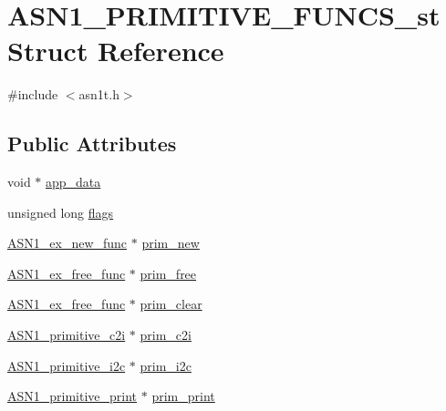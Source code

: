 \hypertarget{struct_a_s_n1___p_r_i_m_i_t_i_v_e___f_u_n_c_s__st}{}\section{A\+S\+N1\+\_\+\+P\+R\+I\+M\+I\+T\+I\+V\+E\+\_\+\+F\+U\+N\+C\+S\+\_\+st Struct Reference}
\label{struct_a_s_n1___p_r_i_m_i_t_i_v_e___f_u_n_c_s__st}


{\ttfamily \#include $<$asn1t.\+h$>$}

\subsection*{Public Attributes}
\begin{DoxyCompactItemize}
\item 
void $\ast$ \hyperlink{struct_a_s_n1___p_r_i_m_i_t_i_v_e___f_u_n_c_s__st_a4ab6489e068922032976724d4bb02644}{app\+\_\+data}
\item 
unsigned long \hyperlink{struct_a_s_n1___p_r_i_m_i_t_i_v_e___f_u_n_c_s__st_a9ea38cfb70abc1afd0fe8f272015737b}{flags}
\item 
\hyperlink{asn1t_8h_a974a90edb24a690e5e664128a975412e}{A\+S\+N1\+\_\+ex\+\_\+new\+\_\+func} $\ast$ \hyperlink{struct_a_s_n1___p_r_i_m_i_t_i_v_e___f_u_n_c_s__st_a0fe6cb24ad4850f35c72bdc080ad9c4a}{prim\+\_\+new}
\item 
\hyperlink{asn1t_8h_a98b861bda8c86873a9d02978fcba10cf}{A\+S\+N1\+\_\+ex\+\_\+free\+\_\+func} $\ast$ \hyperlink{struct_a_s_n1___p_r_i_m_i_t_i_v_e___f_u_n_c_s__st_a19634516049ebbaa076d9c1693580130}{prim\+\_\+free}
\item 
\hyperlink{asn1t_8h_a98b861bda8c86873a9d02978fcba10cf}{A\+S\+N1\+\_\+ex\+\_\+free\+\_\+func} $\ast$ \hyperlink{struct_a_s_n1___p_r_i_m_i_t_i_v_e___f_u_n_c_s__st_af2d9eebde7d5b07a096954e4e8129e09}{prim\+\_\+clear}
\item 
\hyperlink{asn1t_8h_ab34a4f1715f45ed81e472fd414514dde}{A\+S\+N1\+\_\+primitive\+\_\+c2i} $\ast$ \hyperlink{struct_a_s_n1___p_r_i_m_i_t_i_v_e___f_u_n_c_s__st_ad798e3c6d829661a8c5607d271454a4f}{prim\+\_\+c2i}
\item 
\hyperlink{asn1t_8h_a72e2873d17f193fa4ea3065ec836faeb}{A\+S\+N1\+\_\+primitive\+\_\+i2c} $\ast$ \hyperlink{struct_a_s_n1___p_r_i_m_i_t_i_v_e___f_u_n_c_s__st_abee28722d73a140d6fdff1ee669843da}{prim\+\_\+i2c}
\item 
\hyperlink{asn1t_8h_ab187aa961b579cd7c27152c51a3e21b3}{A\+S\+N1\+\_\+primitive\+\_\+print} $\ast$ \hyperlink{struct_a_s_n1___p_r_i_m_i_t_i_v_e___f_u_n_c_s__st_a8fd7a2f06014a2bb7c4bd274407eb61d}{prim\+\_\+print}
\end{DoxyCompactItemize}


